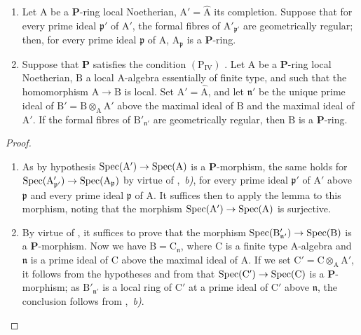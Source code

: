\begin{corollary}[7.4.3]
\label{IV.7.4.3}
\begin{enumerate}[label=\emph{\roman*)}]
  \item Let $\mathrm{A}$ be a $\boldsymbol{P}$-ring local Noetherian, $\mathrm{A}'=\widehat{\mathrm{A}}$ its completion.
  Suppose that for every prime ideal $\mathfrak{p}'$ of $\mathrm{A}'$, the formal fibres of $\mathrm{A}'_{\mathfrak{p}'}$ are geometrically regular; then, for every prime ideal $\mathfrak{p}$ of $\mathrm{A}$, $\mathrm{A}_\mathfrak{p}$ is a $\boldsymbol{P}$-ring.

  \item Suppose that $\boldsymbol{P}$ satisfies the condition $(\mathrm{P_{IV}})$ .
  Let $\mathrm{A}$ be a $\boldsymbol{P}$-ring local Noetherian, $\mathrm{B}$ a local A-algebra essentially of finite type, and such that the homomorphism $\mathrm{A}\to\mathrm{B}$ is local.
  Set $\mathrm{A}'=\widehat{\mathrm{A}}$, and let $\mathfrak{n}'$ be the unique prime ideal of $\mathrm{B}'=\mathrm{B}\otimes_\mathrm{A}\mathrm{A}'$ above the maximal ideal of $\mathrm{B}$ and the maximal ideal of $\mathrm{A}'$.
  If the formal fibres of $\mathrm{B}'_{\mathfrak{n}'}$ are geometrically regular, then $\mathrm{B}$ is a $\boldsymbol{P}$-ring.
\end{enumerate}
\end{corollary}

\begin{proof}
\begin{enumerate}[label=(\roman*)]
  \item As by hypothesis $\operatorname{Spec}(\mathrm{A}')\to\operatorname{Spec}(\mathrm{A})$ is a $\boldsymbol{P}$-morphism, the same holds for $\operatorname{Spec}(\mathrm{A}'_{\mathfrak{p}'})\to\operatorname{Spec}(\mathrm{A}_\mathfrak{p})$ by virtue of ,~\emph{b)}, for every prime ideal $\mathfrak{p}'$ of $\mathrm{A}'$ above $\mathfrak{p}$ and every prime ideal $\mathfrak{p}$ of $\mathrm{A}$.
  It suffices then to apply the lemma  to this morphism, noting that the morphism $\operatorname{Spec}(\mathrm{A}')\to\operatorname{Spec}(\mathrm{A})$ is surjective.

  \item By virtue of , it suffices to prove that the morphism $\operatorname{Spec}(\mathrm{B}'_{\mathfrak{n}'})\to\operatorname{Spec}(\mathrm{B})$ is a $\boldsymbol{P}$-morphism.
  Now we have $\mathrm{B}=\mathrm{C}_\mathfrak{n}$, where $\mathrm{C}$ is a finite type A-algebra and $\mathfrak{n}$ is a prime ideal of $\mathrm{C}$ above the maximal ideal of $\mathrm{A}$.
  If we set $\mathrm{C}'=\mathrm{C}\otimes_\mathrm{A}\mathrm{A}'$, it follows from the hypotheses and from  that $\operatorname{Spec}(\mathrm{C}')\to\operatorname{Spec}(\mathrm{C})$ is a $\boldsymbol{P}$-morphism; as $\mathrm{B}'_{\mathfrak{n}'}$ is a local ring of $\mathrm{C}'$ at a prime ideal of $\mathrm{C}'$ above $\mathfrak{n}$, the conclusion follows from ,~\emph{b)}.
\end{enumerate}
\end{proof}


